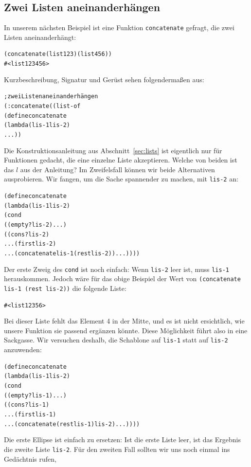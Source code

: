 \subsection{Zwei Listen aneinanderhängen}
In unserem nächsten Beispiel ist eine Funktion
\texttt{concatenate} gefragt, die zwei
Listen aneinanderhängt:\label{sec:concatenate}
% 
\begin{alltt}
(concatenate (list 1 2 3) (list 4 5 6))
\evalsto{} #<list 1 2 3 4 5 6>
\end{alltt}
%
Kurzbeschreibung, Signatur und Gerüst sehen folgendermaßen aus:
%
\begin{alltt}
; zwei Listen aneinanderhängen
(: concatenate ((list-of %
(define concatenate
  (lambda (lis-1 lis-2)
    ...))
\end{alltt}
%
Die Konstruktionsanleitung aus Abschnitt~\ref{sec:lists} ist
eigentlich nur für Funktionen gedacht, die eine einzelne Liste
akzeptieren.  Welche von beiden ist das $l$ aus der Anleitung?  Im
Zweifelsfall können wir beide Alternativen ausprobieren.  Wir
fangen, um die Sache spannender zu machen, mit \texttt{lis-2} an:
%
\begin{alltt}
(define concatenate
  (lambda (lis-1 lis-2)
    (cond
      ((empty? lis-2) ...)
      ((cons? lis-2) 
       ... (first lis-2)
       ... (concatenate lis-1 (rest lis-2)) ...))))
\end{alltt}
%
Der erste Zweig des \texttt{cond} ist noch einfach: Wenn
\texttt{lis-2} leer ist, muss \texttt{lis-1} herauskommen.  Jedoch wäre für
das obige Beispiel der Wert von \texttt{(concatenate lis-1 (rest lis-2))} die
folgende Liste:
%
\begin{alltt}
#<list 1 2 3 5 6>
\end{alltt}
%
Bei dieser Liste fehlt das
Element 4 in der Mitte, und es ist nicht ersichtlich, wie unsere Funktion
sie passend ergänzen könnte.  Diese
Möglichkeit führt also in eine Sackgasse. Wir versuchen deshalb, die Schablone  auf
\texttt{lis-1} 
 statt auf \texttt{lis-2} anzuwenden:
%
\begin{alltt}
(define concatenate
  (lambda (lis-1 lis-2)
    (cond
      ((empty? lis-1) ...)
      ((cons? lis-1) 
       ... (first lis-1)
       ... (concatenate (rest lis-1) lis-2) ...))))
\end{alltt}
%
Die erste Ellipse ist einfach zu ersetzen:  Ist die erste Liste
leer, ist das Ergebnis die zweite Liste \texttt{lis-2}.  Für den
zweiten Fall sollten wir uns noch einmal ins Gedächtnis rufen,
